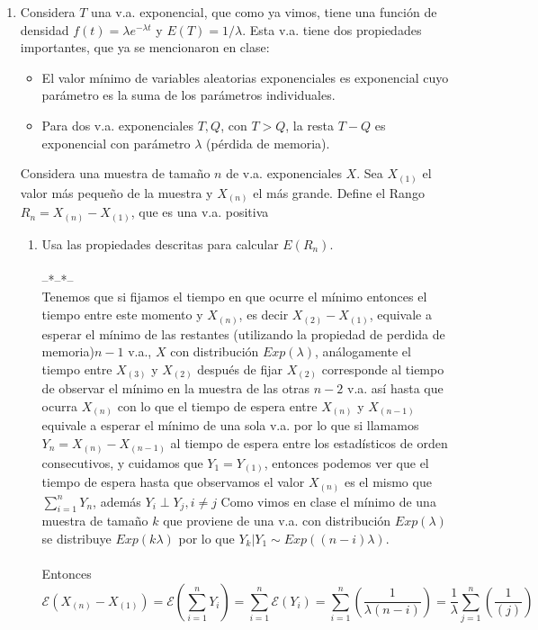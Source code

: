 \documentclass[letter]{memoir} %
\begin{document}
\begin{enumerate}
\item  
Considera $T$ una v.a. exponencial, que como ya vimos, tiene una función de densidad $f(t) =\lambda e^{-\lambda t}$ y $E(T)=1/\lambda$. Esta v.a. tiene dos propiedades importantes, que ya se mencionaron en clase: 
\begin{itemize}

\item El valor mínimo de variables aleatorias exponenciales es exponencial cuyo parámetro es la suma de los parámetros individuales.  
\item Para dos v.a. exponenciales $T,Q$, con $T>Q$, la resta $T-Q$ es exponencial con parámetro $\lambda$ (pérdida de memoria).

\end{itemize}
Considera una muestra de tamaño $n$ de v.a. exponenciales $X$. Sea $X_{(1)}$ el valor más pequeño de la muestra y $X_{(n)}$ el más grande. Define el Rango $R_n = X_{(n)}-X_{(1)}$, que es una v.a. positiva
\begin{enumerate}
\item Usa las propiedades descritas para calcular $E(R_n).$\\\\
--*--*--\\
Tenemos que si fijamos el tiempo en que ocurre el mínimo entonces el tiempo entre este momento y $X_{(n)}$, es decir $X_{(2)} - X_{(1)}$, equivale a esperar el mínimo de las restantes (utilizando la propiedad de perdida de memoria)$n-1$ v.a., $X$ con distribución $Exp(\lambda)$, análogamente el tiempo entre $X_{(3)}$ y $X_{(2)}$ después de fijar $X_{(2)}$ corresponde al tiempo de observar el mínimo en la muestra de las otras $n-2$ v.a. así hasta que ocurra $X_{(n)}$ con lo que el tiempo de espera entre $X_{(n)}$ y $X_{(n-1)}$ equivale a esperar el mínimo de una sola v.a. por lo que si llamamos $Y_n = X_{(n)} - X_{(n-1)}$ al tiempo de espera entre los estadísticos de orden consecutivos, y cuidamos que $Y_1 = Y_{(1)}$, entonces podemos ver que el tiempo de espera hasta que observamos el valor $X_{(n)}$ es el mismo que $\sum_{i=1}^nY_n$, además $Y_i \perp Y_j, i\ne j$
Como vimos en clase el mínimo de una muestra de tamaño $k$ que proviene de una v.a. con distribución $Exp(\lambda)$ se distribuye $Exp(k\lambda)$ por lo que $Y_k|Y_1 \sim Exp((n-i)\lambda)$.  \\\\

Entonces \[\mathcal{E}( X_{(n)} - X_{(1)} ) = \mathcal{E}( \sum_{i=1}^nY_{i} ) =  \sum_{i=1}^n\mathcal{E}(Y_{i} ) =\sum_{i=1}^n( \frac{1}{\lambda (n-i)} ) = \frac{1}{\lambda} \sum_{j=1}^{n}( \frac{1}{(j)} )  \]



\end{enumerate}
\end{enumerate}
\end{document}
